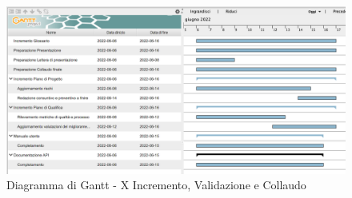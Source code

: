 \begin{figure}[H]
	\centering
	\includegraphics[scale=0.40]{Sezioni/gantt/X_incremento.png}
	\caption{Diagramma di Gantt - X Incremento, Validazione e Collaudo}
\end{figure}








